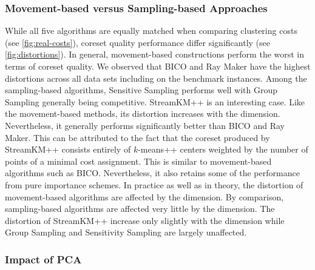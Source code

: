 \subsubsection*{Movement-based versus Sampling-based Approaches}
While all five algorithms are equally matched when comparing clustering costs (see  \cref{fig:real-costs}), coreset quality performance differ significantly (see \cref{fig:distortions}). 
In general, movement-based constructions perform the worst in terms of coreset quality. 
We observed that BICO and Ray Maker have the highest distortions across all data sets including on the benchmark instances. Among the sampling-based algorithms, Sensitive Sampling performs well with Group Sampling generally being competitive. StreamKM++ is an interesting case. Like the movement-based methods, its distortion increases with the dimension. Nevertheless, it generally performs significantly better than BICO and Ray Maker. This can be attributed to the fact that the coreset produced by StreamKM++ consists entirely of $k$-means++ centers weighted by the number of points of a minimal cost assignment. This is similar to movement-based algorithms such as BICO. Nevertheless, it also retains some of the performance from pure importance schemes.
In practice as well as in theory, the distortion of movement-based algorithms are affected by the dimension. By comparison, sampling-based algorithms are affected very little by the dimension. The distortion of StreamKM++ increase only slightly with the dimension while Group Sampling and Sensitivity Sampling are largely unaffected.





\subsubsection*{Impact of PCA}

